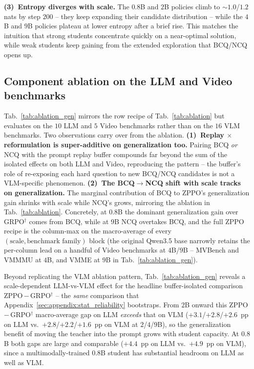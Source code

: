 \textbf{(3)~Entropy diverges with scale.} The $0.8$B and $2$B policies climb to $\sim$$1.0$/$1.2$ nats by step $200$ -- they keep expanding their candidate distribution -- while the $4$B and $9$B policies plateau at lower entropy after a brief rise. This matches the intuition that strong students concentrate quickly on a near-optimal solution, while weak students keep gaining from the extended exploration that BCQ/NCQ opens up.

\subsection{Component ablation on the LLM and Video benchmarks}
\label{sec:appendix:ablation_gen}



Tab.~\ref{tab:ablation_gen} mirrors the row recipe of Tab.~\ref{tab:ablation} but evaluates on the $10$ LLM and $5$ Video benchmarks rather than on the $16$ VLM benchmarks. Two observations carry over from the ablation. \textbf{(1)~Replay $\times$ reformulation is super-additive on generalization too.} Pairing BCQ \emph{or} NCQ with the prompt replay buffer compounds far beyond the sum of the isolated effects on both LLM and Video, reproducing the pattern -- the buffer's role of re-exposing each hard question to new BCQ/NCQ candidates is not a VLM-specific phenomenon. \textbf{(2)~The BCQ$\rightarrow$NCQ shift with scale tracks on generalization.} The marginal contribution of BCQ to ZPPO's generalization gain shrinks with scale while NCQ's grows, mirroring the ablation in Tab.~\ref{tab:ablation}. Concretely, at $0.8$B the dominant generalization gain over GRPO$^{\dagger}$ comes from BCQ, while at $9$B NCQ overtakes BCQ, and the full ZPPO recipe is the column-max on the macro-average of every $(\text{scale}, \text{benchmark family})$ block (the original Qwen3.5 base narrowly retains the per-column lead on a handful of Video benchmarks at $4$B/$9$B -- MVBench and VMMMU at $4$B, and VMME at $9$B in Tab.~\ref{tab:ablation_gen}).

Beyond replicating the VLM ablation pattern, Tab.~\ref{tab:ablation_gen} reveals a scale-dependent LLM-vs-VLM effect for the headline buffer-isolated comparison ZPPO\,$-$\,GRPO$^{\dagger}$ -- the \emph{same} comparison that Appendix~\ref{sec:appendix:stat_reliability} bootstraps. From $2$B onward this ZPPO\,$-$\,GRPO$^{\dagger}$ macro-average gap on LLM \emph{exceeds} that on VLM ($+3.1$/$+2.8$/$+2.6$~pp on LLM vs.\ $+2.8$/$+2.2$/$+1.6$~pp on VLM at $2$/$4$/$9$B), so the generalization benefit of moving the teacher into the prompt grows with student capacity. At $0.8$B both gaps are large and comparable ($+4.4$~pp on LLM vs.\ $+4.9$~pp on VLM), since a multimodally-trained $0.8$B student has substantial headroom on LLM as well as VLM.

